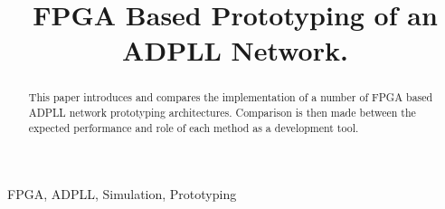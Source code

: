 \documentclass[conference]{IEEEtran}
\begin{document}
\title{FPGA Based Prototyping of an ADPLL Network.\\}

\author{
}

\maketitle

\begin{abstract}
    This paper introduces and compares the implementation of a number of FPGA based ADPLL network prototyping architectures. Comparison is then made between the expected performance and role of each method as a development tool.
\end{abstract}

\begin{IEEEkeywords}
    FPGA, ADPLL, Simulation, Prototyping
\end{IEEEkeywords}
\end{document}
